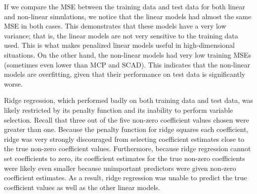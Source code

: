 \documentclass{article}
\begin{document}

	

	
	If we compare the MSE between the training data and test data for both linear and non-linear simulations, we notice that the linear models had almost the same MSE in both cases. This demonstrates that these models have a very low variance; that is, the linear models are not very sensitive to the training data used. This is what makes penalized linear models useful in high-dimensional situations. On the other hand, the non-linear models had very low training MSEs (sometimes even lower than MCP and SCAD). This indicates that the non-linear models are overfitting, given that their performance on test data is significantly worse.
	
	Ridge regression, which performed badly on both training data and test data, was likely restricted by its penalty function and its inability to perform variable selection. Recall that three out of the five non-zero coefficient values chosen were greater than one. Because the penalty function for ridge squares each coefficient, ridge was very strongly discouraged from selecting coefficient estimates close to the true non-zero coefficient values. Furthermore, because ridge regression cannot set coefficients to zero, its coefficient estimates for the true non-zero coefficients were likely even smaller because unimportant predictors were given non-zero coefficient estimates. As a result, ridge regression was unable to predict the true coefficient values as well as the other linear models.
	
\end{document}

